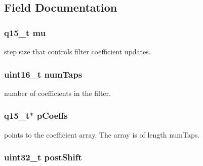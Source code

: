 \subsection{Field Documentation}
\hypertarget{structarm__lms__instance__q15_aab4745770bd667de040227eec1b5ff8d}{
\subsubsection[{mu}]{\setlength{\rightskip}{0pt plus 5cm}q15\-\_\-t mu}}\label{structarm__lms__instance__q15_aab4745770bd667de040227eec1b5ff8d}
step size that controls filter coefficient updates. \hypertarget{structarm__lms__instance__q15_a751941891e47f522a7f5375fe8990aac}{
\subsubsection[{num\-Taps}]{\setlength{\rightskip}{0pt plus 5cm}uint16\-\_\-t num\-Taps}}\label{structarm__lms__instance__q15_a751941891e47f522a7f5375fe8990aac}
number of coefficients in the filter. \hypertarget{structarm__lms__instance__q15_a7ca181a37f714d174445f486bebce26f}{
\subsubsection[{p\-Coeffs}]{\setlength{\rightskip}{0pt plus 5cm}q15\-\_\-t$\ast$ p\-Coeffs}}\label{structarm__lms__instance__q15_a7ca181a37f714d174445f486bebce26f}
points to the coefficient array. The array is of length num\-Taps. \hypertarget{structarm__lms__instance__q15_aa2cacddfc5e1d86905d7d31a18b1979b}{
\subsubsection[{post\-Shift}]{\setlength{\rightskip}{0pt plus 5cm}uint32\-\_\-t post\-Shift}}\label{structarm__lms__instance__q15_aa2cacddfc5e1d86905d7d31a18b1979b}

